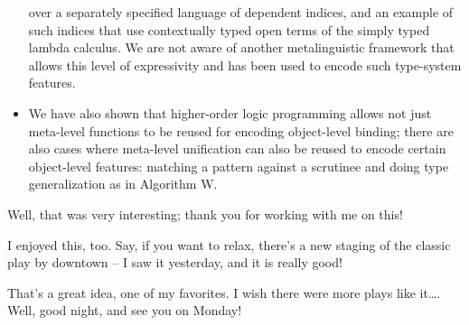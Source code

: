 \begin{itemize}
  over a separately specified language of dependent indices, and an
  example of such indices that use contextually typed open terms of the
  simply typed lambda calculus. We are not aware of another
  metalinguistic framework that allows this level of expressivity and
  has been used to encode such type-system features.
\item
  We have also shown that higher-order logic programming allows not just
  meta-level functions to be reused for encoding object-level binding;
  there are also cases where meta-level unification can also be reused
  to encode certain object-level features: matching a pattern against a
  scrutinee and doing type generalization as in Algorithm W.
\end{itemize}

\heroSTUDENT{} Well, that was very interesting; thank you for working with me
on this!

\heroADVISOR{} I enjoyed this, too. Say, if you want to relax, there's a new
staging of the classic play by \citet{fischer2010play} downtown -- I saw
it yesterday, and it is really good!

\heroSTUDENT{} That's a great idea, one of my favorites. I wish there were
more plays like it\ldots{}. Well, good night, and see you on Monday!
